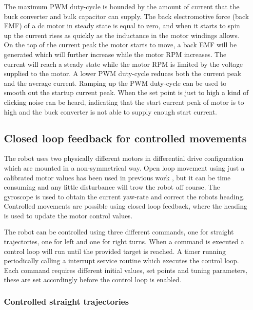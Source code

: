 
The maximum PWM duty-cycle is bounded by the amount of current that the buck converter and bulk capacitor can supply.
The back electromotive force (back EMF) of a dc motor in steady state is equal to zero, and when it starts to spin up the current rises as quickly as the inductance in the motor windings allows. 
On the top of the current peak the motor starts to move, a back EMF will be generated which will further increase while the motor RPM increases.
The current will reach a steady state while the motor RPM is limited by the voltage supplied to the motor.
A lower PWM duty-cycle reduces both the current peak and the average current.
Ramping up the PWM duty-cycle can be used to smooth out the startup current peak.
When the set point is just to high a kind of clicking noise can be heard, indicating that the start current peak of motor is to high and the buck converter is not able to supply enough start current.

\subsection{Closed loop feedback for controlled movements}

The robot uses two physically different motors in differential drive configuration which are mounted in a non-symmetrical way.
Open loop movement using just a calibrated motor values has been used in previous work \cite{legoc_uist_2016}, but it can be time consuming and any little disturbance will trow the robot off course.
The gyroscope is used to obtain the current yaw-rate and correct the robots heading.
Controlled movements are possible using closed loop feedback, where the heading is used to update the motor control values.

The robot can be controlled using three different commands, one for straight trajectories, one for left and one for right turns.
When a command is executed a control loop will run until the provided target is reached.
A timer running periodically calling a interrupt service routine which executes the control loop.   
Each command requires different initial values, set points and tuning parameters, these are set accordingly before the control loop is enabled.

\subsubsection{Controlled straight trajectories}

